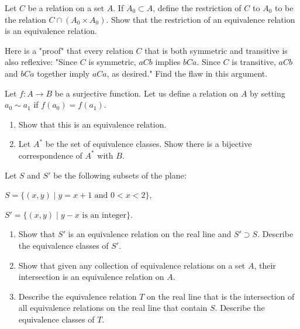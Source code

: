   \begin{exercise}[Munkres 3.2]
    Let $C$ be a relation on a set $A$. If $A_0 \subset A$, define the restriction of $C$ to $A_0$ to be the relation $C \cap (A_0 \times A_0)$. Show that the restriction of an equivalence relation is an equivalence relation.
  \end{exercise}
  \begin{solution}
    
  \end{solution}

  \begin{exercise}[Munkres 3.3]
    Here is a "proof" that every relation $C$ that is both symmetric and transitive is also reflexive: "Since $C$ is symmetric, $aCb$ implies $bCa$. Since $C$ is transitive, $aCb$ and $bCa$ together imply $aCa$, as desired." Find the flaw in this argument.
  \end{exercise}
  \begin{solution}
    
  \end{solution}

  \begin{exercise}[Munkres 3.4]
    Let $f: A \to B$ be a surjective function. Let us define a relation on $A$ by setting $a_0 \sim a_1$ if $f(a_0) = f(a_1)$.
    \begin{enumerate}
      \item Show that this is an equivalence relation.
      \item Let $A^*$ be the set of equivalence classes. Show there is a bijective correspondence of $A^*$ with $B$.
    \end{enumerate}
  \end{exercise}
  \begin{solution}
    
  \end{solution}

  \begin{exercise}[Munkres 3.5]
    Let $S$ and $S'$ be the following subsets of the plane:

    $S = \{(x, y) \mid y = x + 1 \text{ and } 0 < x < 2\}$,

    $S' = \{(x, y) \mid y - x \text{ is an integer}\}$.
    \begin{enumerate}
      \item Show that $S'$ is an equivalence relation on the real line and $S' \supset S$. Describe the equivalence classes of $S'$.
      \item Show that given any collection of equivalence relations on a set $A$, their intersection is an equivalence relation on $A$.
      \item Describe the equivalence relation $T$ on the real line that is the intersection of all equivalence relations on the real line that contain $S$. Describe the equivalence classes of $T$.
    \end{enumerate}
  \end{exercise}
  \begin{solution}
    
  \end{solution}

